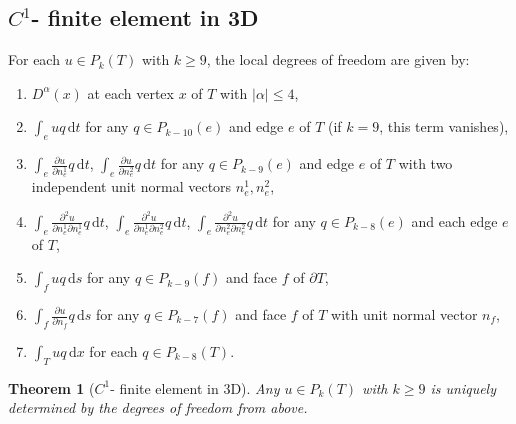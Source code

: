 \documentclass[a4paper]{amsart}
\numberwithin{equation}{section}
\newcommand\ds{\,\text{d}s}
\newcommand\dt{\,\text{d}t}
\newcommand\dx{\,\text{d}x}
\newtheorem{theorem}{Theorem}[section]
\theoremstyle{definition}
\theoremstyle{remark}
\numberwithin{theorem}{section}
\numberwithin{equation}{section}
\numberwithin{table}{section}
\numberwithin{figure}{section}
\begin{document}
\subsection{$C^1$- finite element in 3D}\label{appendix-2}
For each $u\in P_k(T)$ with $k\geq 9$, the local degrees of freedom are given by:
\begin{enumerate}
	\item $D^\alpha(x)$ at each vertex $x$ of $T$ with $|\alpha|\leq 4$,
	\item $\int_e u q \dt$ for any $q\in P_{k-10}(e)$ and edge $e$ of $T$ (if $k=9$, this term vanishes),
	\item $\int_e \tfrac{\partial u}{\partial n_{e}^1}q \dt$, $\int_e\tfrac{\partial u}{\partial n_{e}^2}q \dt$ for any $q\in P_{k-9}(e)$ and edge $e$ of $T$ with two independent unit normal vectors $n_e^1,n_e^2$,
	\item $\int_e\tfrac{\partial^2 u}{\partial n_{e}^1\partial n_{e}^1}q \dt$, $\int_e\tfrac{\partial^2 u}{\partial n_{e}^1\partial n_{e}^2}q \dt$, $\int_e\tfrac{\partial^2 u}{\partial n_{e}^2\partial n_{e}^2} q \dt$ for any $q\in P_{k-8}(e)$ and each edge $e$ of $T$,
	\item $\int_f uq \ds$ for any $q\in P_{k-9}(f)$ and face $f$ of $\partial T$,
	\item $\int_f \tfrac{\partial u}{\partial n_f} q \ds$ for any $q\in P_{k-7}(f)$ and face $f$ of $T$ with unit normal vector $n_f$,
	\item $\int_Tuq \dx$ for each $q\in P_{k-8}(T)$.
\end{enumerate}
\begin{theorem}[$C^1$- finite element in 3D]\label{thm:C1_3D}
	Any $u\in P_k(T)$ with $k\geq 9$ is uniquely determined by the degrees of freedom from above.
\end{theorem}
\end{document}
